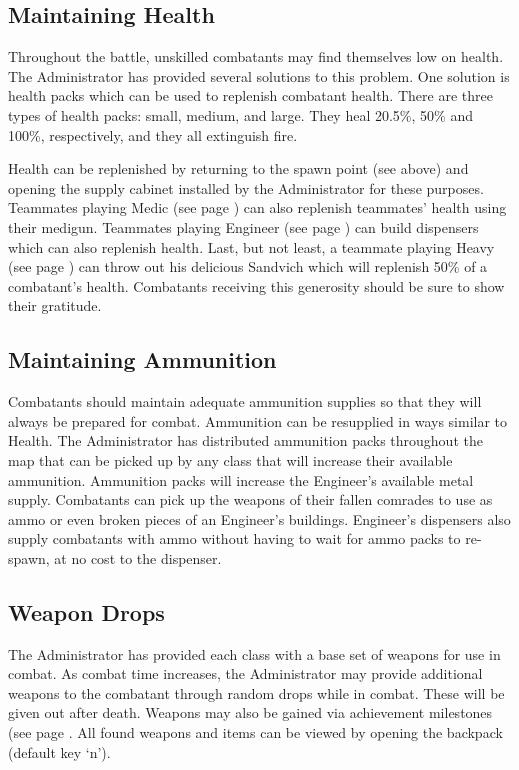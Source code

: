 \subsection{Maintaining Health}
\label{Maintaining_Health}
Throughout the battle, unskilled combatants may find themselves low on health. The Administrator has provided several solutions to this problem. One solution is health packs which can be used to replenish combatant health. There are three types of health packs: small, medium, and large. They heal 20.5\%, 50\% and 100\%, respectively, and they all extinguish fire.

Health can be replenished by returning to the spawn point (see above) and opening the supply cabinet installed by the Administrator for these purposes. Teammates playing Medic (see page \pageref{Medic}) can also replenish teammates' health using their medigun. Teammates playing Engineer (see page \pageref{Engineer}) can build dispensers which can also replenish health. Last, but not least, a teammate playing Heavy (see page \pageref{Heavy}) can throw out his delicious Sandvich which will replenish 50\% of a combatant's health. Combatants receiving this generosity should be sure to show their gratitude.

\subsection{Maintaining Ammunition}
\label{Maintaining_Ammunition}
Combatants should maintain adequate ammunition supplies so that they will always be prepared for combat.  Ammunition can be resupplied in ways similar to Health.  The Administrator has distributed ammunition packs throughout the map that can be picked up by any class that will increase their available ammunition.  Ammunition packs will increase the Engineer's available metal supply. Combatants can pick up the weapons of their fallen comrades to use as ammo or even broken pieces of an Engineer's buildings.  Engineer's dispensers also supply combatants with ammo without having to wait for ammo packs to re-spawn, at no cost to the dispenser.

\subsection{Weapon Drops}
The Administrator has provided each class with a base set of weapons for use in combat.  As combat time increases, the Administrator may provide additional weapons to the combatant through random drops while in combat. These will be given out after death.  Weapons may also be gained via achievement milestones (see page \pageref{Achievements}. All found weapons and items can be viewed by opening the backpack (default key `n'). 

